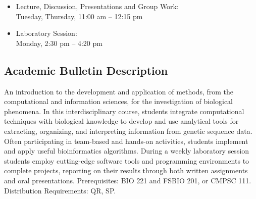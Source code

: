 \documentclass[11pt]{article} %
\begin{document}
\begin{itemize}
    \item Lecture, Discussion, Presentations and Group Work:\\
        \indent Tuesday, Thursday, 11:00 am -- 12:15 pm 
    \item Laboratory Session:\\
        \indent Monday, 2:30 pm -- 4:20 pm \\
\end{itemize}

\subsection*{\textbf{Academic Bulletin Description}}


An introduction to the development and application of methods, from the computational and information sciences, for the investigation of biological phenomena. In this interdisciplinary course, students integrate computational techniques with biological knowledge to develop and use analytical tools for extracting, organizing, and interpreting information from genetic sequence data. Often participating in team-based and hands-on activities, students implement and apply useful bioinformatics algorithms. During a weekly laboratory session students
employ cutting-edge software tools and programming environments to complete projects, reporting on their results through both written assignments and oral presentations. Prerequisites: BIO 221 and FSBIO 201, or CMPSC 111. Distribution Requirements: QR, SP.

\end{document}

